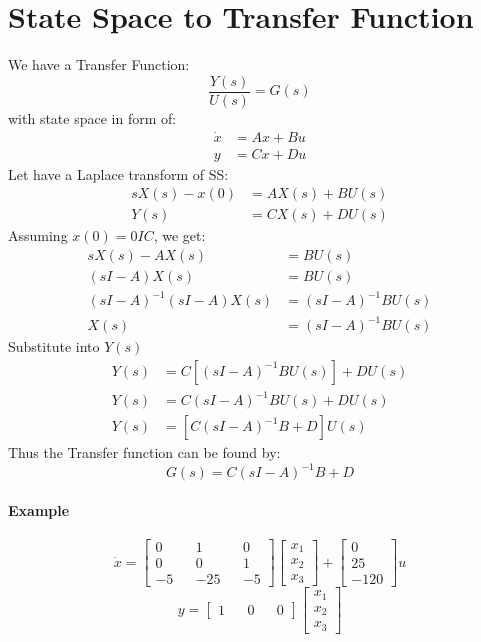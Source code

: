 \section{State Space to Transfer Function}
We have a Transfer Function:
\[
\frac{Y(s)}{U(s)} = G(s)
\]
with state space in form of:
\[
\begin{split}
	\dot{x} &= Ax + Bu \\
	y &= Cx + Du
\end{split}
\]
Let have a Laplace transform of SS:
\[
\begin{split}
	sX(s)-x(0) &= AX(s) + BU(s) \\
	Y(s) &= CX(s) + DU(s)
\end{split}
\]
Assuming \(x(0) = 0 IC\), we get:
\[
\begin{split}
	sX(s) - AX(s) &= BU(s) \\
	(sI - A)X(s) &= BU(s) \\
	(sI - A)^{-1}(sI - A)X(s) &= (sI - A)^{-1}BU(s) \\
	X(s) &= (sI - A)^{-1}BU(s)
\end{split}
\]
Substitute into \(Y(s)\)
\[
\begin{split}
	Y(s) &= C[(sI - A)^{-1}BU(s)] + DU(s) \\
	Y(s) &= C(sI - A)^{-1}BU(s) + DU(s) \\
	Y(s) &= [C(sI - A)^{-1}B + D]U(s)
\end{split}
\]
Thus the Transfer function can be found by:
\[
G(s) = C(sI - A)^{-1}B + D
\]


\paragraph{Example}
\[
\dot{x} = 
\begin{bmatrix}
	0  &   & 1   &   & 0  \\
	0  &   & 0   &   & 1  \\
	-5 &   & -25 &   & -5 
\end{bmatrix}
\begin{bmatrix}
	x_1 \\
	x_2 \\
	x_3 
\end{bmatrix} + 
\begin{bmatrix}
	0    \\
	25   \\
	-120 
\end{bmatrix} u
\]
\[
y =
\begin{bmatrix}
	1 &   & 0 &   & 0 
\end{bmatrix}
\begin{bmatrix}
	x_1 \\
	x_2 \\
	x_3 
\end{bmatrix}
\]

